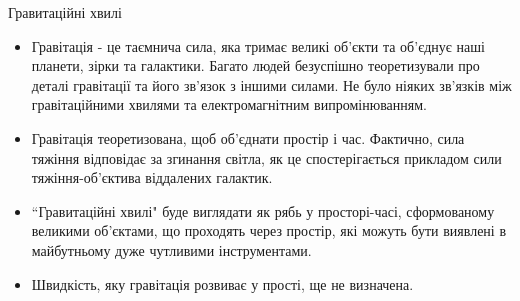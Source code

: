 {\white

{\Large Гравитаційні хвилі}

\begin{itemize}

\item Гравітація - це таємнича сила, яка тримає великі об'єкти та об'єднує наші планети, зірки та галактики. Багато людей безуспішно теоретизували про деталі гравітації та його зв'язок з іншими силами. Не було ніяких зв'язків між гравітаційними хвилями та електромагнітним випромінюванням.

\item Гравітація теоретизована, щоб об'єднати простір і час. Фактично, сила тяжіння відповідає за згинання світла, як це спостерігається прикладом сили тяжіння-об'єктива віддалених галактик.

\item ``Гравитаційні хвилі" буде виглядати як рябь у просторі-часі, сформованому великими об'єктами, що проходять через простір, які можуть бути виявлені в майбутньому дуже чутливими інструментами.

\item Швидкість, яку гравітація розвиває у прості, ще не визначена.

\end{itemize}
}

